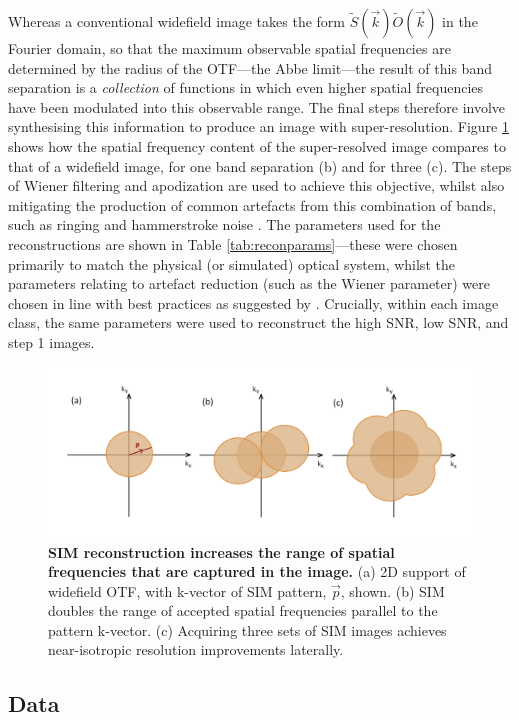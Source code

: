 \documentclass[12pt]{article}
\begin{document}
Whereas a conventional widefield image takes the form $\tilde{S}(\vec{k})\tilde{O}(\vec{k})$ in the Fourier domain,
so that the maximum observable spatial frequencies are determined by the radius of the OTF---the Abbe limit---the
result of this band separation is a \textit{collection} of functions in which even higher spatial frequencies have been modulated into this observable range.
The final steps therefore involve synthesising this information to produce an image with super-resolution.
Figure \ref{fig:SIM_otf} shows how the spatial frequency content of the super-resolved image compares to that of a widefield image,
for one band separation (b) and for three (c).
The steps of Wiener filtering and apodization are used to achieve this objective,
whilst also mitigating the production of common artefacts from this combination of bands,
such as ringing and hammerstroke noise \cite{params}.
The parameters used for the reconstructions are shown in Table \ref{tab:reconparams}---these
were chosen primarily to match the physical (or simulated) optical system,
whilst the parameters relating to artefact reduction (such as the Wiener parameter) were chosen in line with best practices as suggested by \cite{params}.
Crucially, within each image class, the same parameters were used to reconstruct the high SNR, low SNR, and step 1 images.

\begin{figure}[hbtp]
    \includegraphics[scale=0.45, center]{figures/SIM_otf.png}
    \caption{\textbf{SIM reconstruction increases the range of spatial frequencies that are captured in the image.}
    (a) 2D support of widefield OTF, with k-vector of SIM pattern, $\vec{p}$, shown.
    (b) SIM doubles the range of accepted spatial frequencies parallel to the pattern k-vector.
    (c) Acquiring three sets of SIM images achieves near-isotropic resolution improvements laterally.}
    \label{fig:SIM_otf}
\end{figure}


\subsection{Data}
\end{document}
